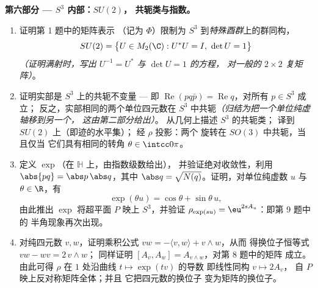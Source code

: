 \begin{problem}
\medskip
\noindent\textbf{第六部分 --- $S^3$ 内部：$SU(2)$，
共轭类与指数。}
\begin{enumerate}[resume]
  \item 证明第 1 题中的矩阵表示
        （记为 $\Phi$）限制为
        $S^3$ 到\emph{特殊酉群}上的群同构，
        \[
        SU(2) = \bigl\{U \in M_2(\C) : U^*U = I,\ \det U =
        1\bigr\}
        \]
        \emph{（证明满射时，写出
        $U^{-1} = U^*$ 与 $\det U = 1$ 的方程，
        对一般的 $2\times2$ 复矩阵）}。
  \item 证明实部是 $S^3$ 上的共轭不变量
        --- 即 $\operatorname{Re}(pq\bar p) =
        \operatorname{Re}q$，对所有 $p \in S^3$ 成立；
        反之，实部相同的两个单位四元数在
        $S^3$ 中共轭\emph{（归结为把一个单位纯虚轴移到另一个，
        这由第二部分给出）}。
        从几何上描述 $S^3$ 的共轭类；
        译到 $SU(2)$ 上（即迹的水平集）；
        经 $\rho$ 投影：两个
        旋转在 $SO(3)$ 中共轭，当且仅当
        它们具有相同的转角 $\theta \in \intcc0\pi$。
  \item 定义 $\exp$（在 $\mathbb H$ 上，由指数级数给出），
        并验证绝对收敛性，利用
        $\abs{pq} = \abs p\,\abs q$，其中 $\abs q =
        \sqrt{N(q)}$。证明，对单位纯虚数 $u$ 与 $\theta
        \in \R$，有
        \[
        \exp(\theta u) = \cos\theta + \sin\theta\,u ,
        \]
        由此推出 $\exp$ 将超平面 $P$
        映上 $S^3$，并验证 $\rho_{\exp(su)} =
        \eu^{2sA_u}$：即第 9 题中的
        半角现象再次出现。
  \item 对纯四元数 $v, w$，证明乘积公式
        $vw = -\langle v, w\rangle + v\wedge w$，从而
        得换位子恒等式 $vw - wv = 2\,v\wedge w$；
        同样证明 $[A_v, A_w] = A_{v\wedge w}$，对第 8 题中的矩阵
        成立。由此可得
        $\rho$ 在 $1$ 处沿曲线 $t \mapsto \exp(tv)$ 的导数
        即线性同构 $v \mapsto 2A_v$，
        自 $P$ 映上反对称矩阵全体；并且
        它把四元数的换位子
        变为矩阵的换位子。
\end{enumerate}


\end{problem}
